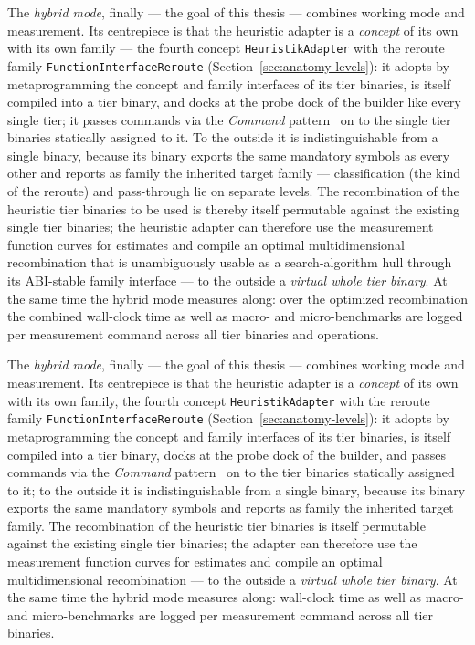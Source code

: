 \begin{nurlang}
The \emph{hybrid mode}, finally --- the goal of this thesis --- combines working mode and measurement. Its
centrepiece is that the heuristic adapter is a \emph{concept} of its own with its own family --- the fourth
concept \texttt{HeuristikAdapter} with the reroute family \texttt{FunctionInterfaceReroute}
(Section~\ref{sec:anatomy-levels}): it adopts by metaprogramming the concept and
family interfaces of its tier binaries, is itself compiled into a tier binary, and docks at the
probe dock of the builder like every single tier; it passes commands via the
\emph{Command} pattern~\cite{gamma1994patterns} on to the single tier binaries statically assigned to it.
To the outside it is indistinguishable from a single binary, because its binary exports the same
mandatory symbols as every other and reports as family the inherited target family --- classification
(the kind of the reroute) and pass-through lie on separate levels. The recombination of the
heuristic tier binaries to be used is thereby itself permutable against the existing single
tier binaries; the heuristic adapter can therefore use the measurement function curves for estimates and
compile an optimal multidimensional recombination that is unambiguously usable as a search-algorithm hull
through its ABI-stable family interface --- to the outside a \emph{virtual whole
tier binary}. At the same time the hybrid mode measures along: over the optimized
recombination the combined wall-clock time as well as macro- and micro-benchmarks are logged per measurement command
across all tier binaries and operations.
\end{nurlang}
\begin{nurkurz}
The \emph{hybrid mode}, finally --- the goal of this thesis --- combines working mode and measurement.
Its centrepiece is that the heuristic adapter is a \emph{concept} of its own with its own family, the
fourth concept \texttt{HeuristikAdapter} with the reroute family \texttt{FunctionInterfaceReroute}
(Section~\ref{sec:anatomy-levels}): it adopts by metaprogramming the concept and family interfaces of its
tier binaries, is itself compiled into a tier binary, docks at the probe dock of the builder, and
passes commands via the \emph{Command} pattern~\cite{gamma1994patterns} on to the tier binaries
statically assigned to it; to the outside it is indistinguishable from a single binary, because its
binary exports the same mandatory symbols and reports as family the inherited target family. The
recombination of the heuristic tier binaries is itself permutable against the existing single tier
binaries; the adapter can therefore use the measurement function curves for estimates and compile an
optimal multidimensional recombination --- to the outside a \emph{virtual whole tier binary}. At the
same time the hybrid mode measures along: wall-clock time as well as macro- and micro-benchmarks are
logged per measurement command across all tier binaries.
\end{nurkurz}

